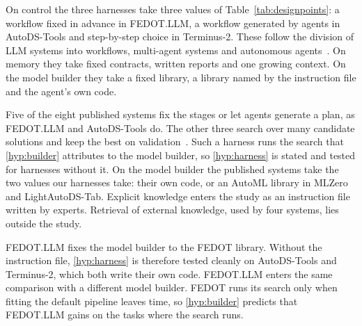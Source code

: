 On control the three harnesses take three values of
Table~\ref{tab:designpoints}: a workflow fixed in advance in FEDOT.LLM, a
workflow generated by agents in AutoDS-Tools and step-by-step choice in Terminus-2. These
follow the division of LLM systems into workflows, multi-agent systems and
autonomous agents~\citep{anthropic2024agents}. On memory they take fixed
contracts, written reports and one growing context. On the model builder
they take a fixed library, a library named by the instruction file and the
agent's own code.

Five of the eight published systems fix the stages or let agents generate a
plan, as FEDOT.LLM and AutoDS-Tools do. The other three search over many
candidate solutions and keep the best on
validation~\citep{yang2025rdagent,kulibaba2025kompeteai,toledo2025aira}.
Such a harness runs the search that \ref{hyp:builder} attributes
to the model builder, so \ref{hyp:harness} is stated and tested
for harnesses without it. On the model builder the published systems take
the two values our harnesses take: their own code, or an AutoML library in
MLZero and LightAutoDS-Tab. Explicit knowledge enters the study as an
instruction file written by experts. Retrieval of external knowledge, used
by four systems, lies outside the study.

FEDOT.LLM fixes the model builder to the FEDOT library. Without the
instruction file, \ref{hyp:harness} is therefore tested cleanly
on AutoDS-Tools and Terminus-2, which both write their own code. FEDOT.LLM
enters the same comparison with a different model builder. FEDOT runs its
search only when fitting the default pipeline leaves time, so
\ref{hyp:builder} predicts that FEDOT.LLM gains on the tasks
where the search runs.
